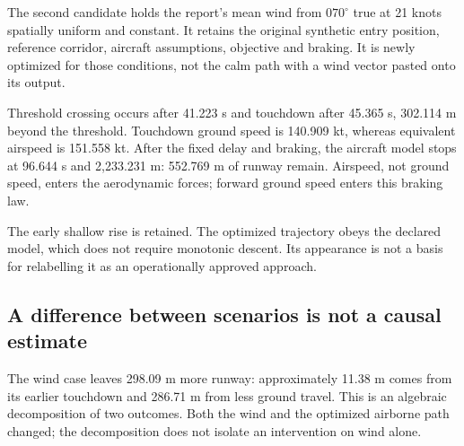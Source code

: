 \label{part:5}
The second candidate holds the report's mean wind from $070^\circ$ true at 21 knots spatially uniform and constant. It retains the original synthetic entry position, reference corridor, aircraft assumptions, objective and braking. It is newly optimized for those conditions, not the calm path with a wind vector pasted onto its output.


Threshold crossing occurs after 41.223 s and touchdown after 45.365 s, 302.114 m beyond the threshold. Touchdown ground speed is 140.909 kt, whereas equivalent airspeed is 151.558 kt. After the fixed delay and braking, the aircraft model stops at 96.644 s and 2,233.231 m: 552.769 m of runway remain. Airspeed, not ground speed, enters the aerodynamic forces; forward ground speed enters this braking law.

The early shallow rise is retained. The optimized trajectory obeys the declared model, which does not require monotonic descent. Its appearance is not a basis for relabelling it as an operationally approved approach.
\clearpage
\subsection*{A difference between scenarios is not a causal estimate}

The wind case leaves 298.09 m more runway: approximately 11.38 m comes from its earlier touchdown and 286.71 m from less ground travel. This is an algebraic decomposition of two outcomes. Both the wind and the optimized airborne path changed; the decomposition does not isolate an intervention on wind alone.

